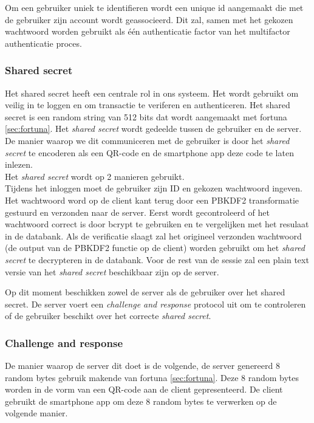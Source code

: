 \documentclass[11pt]{article}
\begin{document}
Om een gebruiker uniek te identifieren wordt een unique id aangemaakt die met de gebruiker zijn account wordt geassocieerd. Dit zal, samen met het gekozen wachtwoord worden gebruikt als één authenticatie factor van het multifactor authenticatie proces.
	
\subsubsection{Shared secret}
Het shared secret heeft een centrale rol in ons systeem. Het wordt gebruikt om veilig in te loggen en om transactie te veriferen en authenticeren. Het shared secret is een random string van 512 bits dat wordt aangemaakt met fortuna \ref{sec:fortuna}. 
Het \emph{shared secret} wordt gedeelde tussen de gebruiker en de server. De manier waarop we dit communiceren met de gebruiker is door het \emph{shared secret} te encoderen als een QR-code en de smartphone app deze code te laten inlezen.\\
Het \emph{shared secret} wordt op 2 manieren gebruikt. \\
Tijdens het inloggen moet de gebruiker zijn ID en gekozen wachtwoord ingeven. Het wachtwoord word op de client kant terug door een PBKDF2 transformatie gestuurd en verzonden naar de server. Eerst wordt gecontroleerd of het wachtwoord correct is door bcrypt te gebruiken en te vergelijken met het resulaat in de databank. Als de verificatie slaagt zal het origineel verzonden wachtwoord (de output van de PBKDF2 functie op de client) worden gebruikt om het \emph{shared secret} te decrypteren in de databank. Voor de rest van de sessie zal een  plain text versie van het \emph{shared secret} beschikbaar zijn op de server.

Op dit moment beschikken zowel de server als de gebruiker over het shared secret. De server voert een \emph{challenge and response} protocol uit om te controleren of de gebruiker beschikt over het correcte \emph{shared secret}.\\

\subsubsection{Challenge and response}
De manier waarop de server dit doet is de volgende, de server genereerd 8 random bytes gebruik makende van fortuna \ref{sec:fortuna}. Deze 8 random bytes worden in de vorm van een QR-code aan de client gepresenteerd. De client gebruikt de smartphone app om deze 8 random bytes te verwerken op de volgende manier.\\
\end{document}
